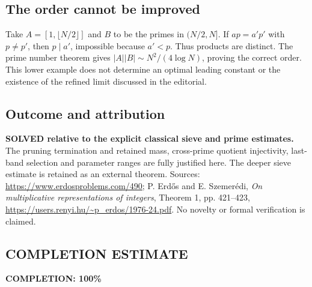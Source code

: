 \subsection*{The order cannot be improved}
Take $A=[1,\lfloor N/2\rfloor]$ and $B$ to be the primes in $(N/2,N]$. If $ap=a'p'$ with $p\ne p'$, then $p\mid a'$, impossible because $a'<p$. Thus products are distinct. The prime number theorem gives $|A||B|\sim N^2/(4\log N)$, proving the correct order. This lower example does not determine an optimal leading constant or the existence of the refined limit discussed in the editorial.

\subsection*{Outcome and attribution}
\textbf{SOLVED relative to the explicit classical sieve and prime estimates.} The pruning termination and retained mass, cross-prime quotient injectivity, last-band selection and parameter ranges are fully justified here. The deeper sieve estimate is retained as an external theorem.
Sources: \url{https://www.erdosproblems.com/490}; P. Erd\H{o}s and E. Szemer\'edi, \emph{On multiplicative representations of integers}, Theorem 1, pp. 421--423, \url{https://users.renyi.hu/~p_erdos/1976-24.pdf}. No novelty or formal verification is claimed.

\subsection*{COMPLETION ESTIMATE}
\textbf{COMPLETION: 100\%}
